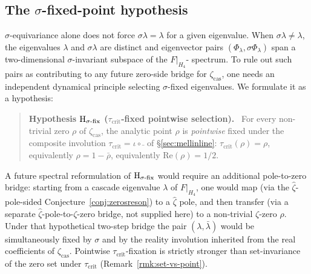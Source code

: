 \documentclass[11pt, a4paper]{amsart}
\theoremstyle{definition}
\newcommand{\zetacas}{\zeta_{\mathrm{cas}}}
\begin{document}
\subsection{The $\sigma$-fixed-point hypothesis}

$\sigma$-equivariance alone does not force $\sigma\lambda = \lambda$
for a given eigenvalue. When $\sigma\lambda \neq \lambda$, the
eigenvalues $\lambda$ and $\sigma\lambda$ are distinct and
eigenvector pairs $(\Phi_\lambda, \sigma\Phi_\lambda)$ span a
two-dimensional $\sigma$-invariant subspace of the $F|_{H_4}$-
spectrum. To rule out such pairs as contributing to any future
zero-side bridge for $\zetacas$, one needs an independent dynamical
principle selecting $\sigma$-fixed eigenvalues. We formulate it as
a hypothesis:

\begin{quote}
\textbf{Hypothesis $\textup{H}_{\sigma\text{-fix}}$
($\tau_{\mathrm{crit}}$-fixed pointwise selection).} \ For every
non-trivial zero $\rho$ of $\zetacas$, the analytic point $\rho$
is \emph{pointwise} fixed under the composite involution
$\tau_{\mathrm{crit}} = \iota \circ \bar{\ }$ of
\S\ref{sec:mellinline}: $\tau_{\mathrm{crit}}(\rho) = \rho$,
equivalently $\rho = 1 - \bar{\rho}$, equivalently
$\mathrm{Re}(\rho) = 1/2$.
\end{quote}

A future spectral reformulation of $\textup{H}_{\sigma\text{-fix}}$
would require an additional pole-to-zero bridge: starting from a
cascade eigenvalue $\lambda$ of $F|_{H_4}$, one would map (via the
$\widehat\zeta$-pole-sided Conjecture~\ref{conj:zerosreson}) to a
$\widehat\zeta$ pole, and then transfer (via a separate
$\widehat\zeta$-pole-to-$\zeta$-zero bridge, not supplied here) to
a non-trivial $\zeta$-zero $\rho$.  Under that hypothetical
two-step bridge the pair $(\lambda, \bar{\lambda})$ would be
simultaneously fixed by $\sigma$ and by the reality involution
inherited from the real coefficients of $\zetacas$.  Pointwise
$\tau_{\mathrm{crit}}$-fixation is strictly stronger than
set-invariance of the zero set under $\tau_{\mathrm{crit}}$
(Remark~\ref{rmk:set-vs-point}).
\end{document}
